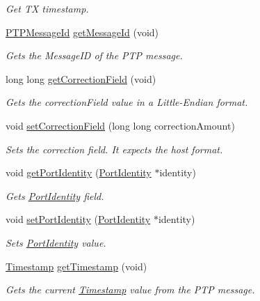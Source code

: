 \begin{DoxyCompactItemize}
\begin{DoxyCompactList}\small\item\em Get TX timestamp. \end{DoxyCompactList}\item 
\hyperlink{class_p_t_p_message_id}{P\+T\+P\+Message\+Id} \hyperlink{class_p_t_p_message_common_a5cd92d7e4383eedc84db3781940ba4e0}{get\+Message\+Id} (void)
\begin{DoxyCompactList}\small\item\em Gets the Message\+ID of the P\+TP message. \end{DoxyCompactList}\item 
long long \hyperlink{class_p_t_p_message_common_a9930feb44509700c6a81aa4e747357ca}{get\+Correction\+Field} (void)
\begin{DoxyCompactList}\small\item\em Gets the correction\+Field value in a Little-\/\+Endian format. \end{DoxyCompactList}\item 
void \hyperlink{class_p_t_p_message_common_acecb3e9987905070c3e9d089bae8e70d}{set\+Correction\+Field} (long long correction\+Amount)
\begin{DoxyCompactList}\small\item\em Sets the correction field. It expects the host format. \end{DoxyCompactList}\item 
void \hyperlink{class_p_t_p_message_common_a81caf27b0bcf771cb3c35d8fe42ae8ed}{get\+Port\+Identity} (\hyperlink{class_port_identity}{Port\+Identity} $\ast$identity)
\begin{DoxyCompactList}\small\item\em Gets \hyperlink{class_port_identity}{Port\+Identity} field. \end{DoxyCompactList}\item 
void \hyperlink{class_p_t_p_message_common_a94378ebb164e2095d3a17b393a63f2dc}{set\+Port\+Identity} (\hyperlink{class_port_identity}{Port\+Identity} $\ast$identity)
\begin{DoxyCompactList}\small\item\em Sets \hyperlink{class_port_identity}{Port\+Identity} value. \end{DoxyCompactList}\item 
\hyperlink{class_timestamp}{Timestamp} \hyperlink{class_p_t_p_message_common_a0bdaf174c565b4d10499011885dde906}{get\+Timestamp} (void)
\begin{DoxyCompactList}\small\item\em Gets the current \hyperlink{class_timestamp}{Timestamp} value from the P\+TP message. \end{DoxyCompactList}\item 

\end{DoxyCompactItemize}
